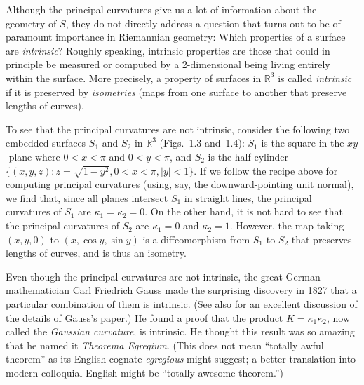 Although the principal curvatures give us a lot of information about the geometry of $S$, they do not directly address a question that turns out to be of paramount importance in Riemannian geometry: Which properties of a surface are \emph{intrinsic}? Roughly speaking, intrinsic properties are those that could in principle be measured or computed by a 2-dimensional being living entirely within the surface. More precisely, a property of surfaces in $\mathbb{R}^3$ is called \emph{intrinsic} if it is preserved by \emph{isometries} (maps from one surface to another that preserve lengths of curves).

To see that the principal curvatures are not intrinsic, consider the following two embedded surfaces $S_1$ and $S_2$ in $\mathbb{R}^3$ (Figs.~1.3 and~1.4): $S_1$ is the square in the $xy$-plane where $0 < x < \pi$ and $0 < y < \pi$, and $S_2$ is the half-cylinder $\{(x,y,z) : z = \sqrt{1-y^2}, 0 < x < \pi, |y| < 1\}$. If we follow the recipe above for computing principal curvatures (using, say, the downward-pointing unit normal), we find that, since all planes intersect $S_1$ in straight lines, the principal curvatures of $S_1$ are $\kappa_1 = \kappa_2 = 0$. On the other hand, it is not hard to see that the principal curvatures of $S_2$ are $\kappa_1 = 0$ and $\kappa_2 = 1$. However, the map taking $(x,y,0)$ to $(x, \cos y, \sin y)$ is a diffeomorphism from $S_1$ to $S_2$ that preserves lengths of curves, and is thus an isometry.




Even though the principal curvatures are not intrinsic, the great German mathematician Carl Friedrich Gauss made the surprising discovery in 1827 \cite{Gau65} that a particular combination of them is intrinsic. (See also \cite[Vol. 2]{Spi79} for an excellent discussion of the details of Gauss's paper.) He found a proof that the product $K = \kappa_1\kappa_2$, now called the \emph{Gaussian curvature}, is intrinsic. He thought this result was so amazing that he named it \emph{Theorema Egregium}. (This does not mean ``totally awful theorem'' as its English cognate \emph{egregious} might suggest; a better translation into modern colloquial English might be ``totally awesome theorem.'')


